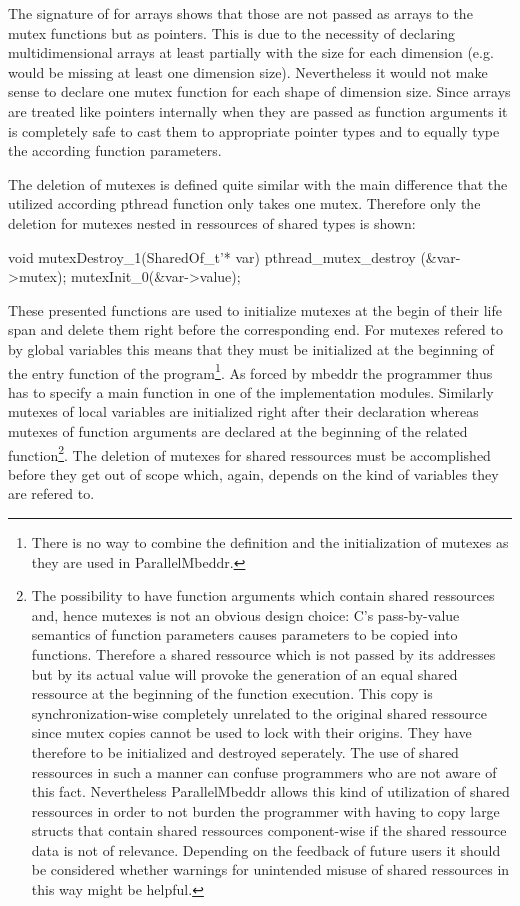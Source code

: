 The signature of  for arrays shows that those are not passed as arrays to the mutex functions but as pointers. This is due to the necessity of declaring multidimensional arrays at least partially with the size for each dimension (e.g.  would be missing at least one dimension size). Nevertheless it would not make sense to declare one mutex function for each shape of dimension size. Since arrays are treated like pointers internally when they are passed as function arguments it is completely safe to cast them to appropriate pointer types and to equally type the according function parameters.

The deletion of mutexes is defined quite similar with the main difference that the utilized according pthread function only takes one mutex. Therefore only the deletion for mutexes nested in ressources of shared types is shown:
\begin{ccode}
void mutexDestroy_1(SharedOf_t'* var) { 
  pthread_mutex_destroy (&var->mutex); 
  mutexInit_0(&var->value); 
}
\end{ccode}
These presented functions are used to initialize mutexes at the begin of their life span and delete them right before the corresponding end. For mutexes refered to by global variables this means that they must be initialized at the beginning of the entry function of the program\footnote{There is no way to combine the definition and the initialization of mutexes as they are used in ParallelMbeddr.}. As forced by mbeddr the programmer thus has to specify a main function in one of the implementation modules. Similarly mutexes of local variables are initialized right after their declaration whereas mutexes of function arguments are declared at the beginning of the related function\footnote{The possibility to have function arguments which contain shared ressources and, hence mutexes is not an obvious design choice: C's pass-by-value semantics of function parameters causes parameters to be copied into functions. Therefore a shared ressource which is not passed by its addresses but by its actual value will provoke the generation of an equal shared ressource at the beginning of the function execution. This copy is synchronization-wise completely unrelated to the original shared ressource since mutex copies cannot be used to lock with their origins. They have therefore to be initialized and destroyed seperately. The use of shared ressources in such a manner can confuse programmers who are not aware of this fact. Nevertheless ParallelMbeddr allows this kind of utilization of shared ressources in order to not burden the programmer with having to copy large structs that contain shared ressources component-wise if the shared ressource data is not of relevance. Depending on the feedback of future users it should be considered whether warnings for unintended misuse of shared ressources in this way might be helpful.}. The deletion of mutexes for shared ressources must be accomplished before they get out of scope which, again, depends on the kind of variables they are refered to. 

